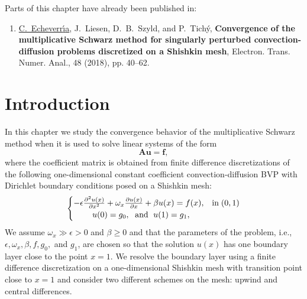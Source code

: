 Parts of this chapter have already been published in:
\vspace*{0.3cm}
%
\begin{enumerate}
\item[\cite{EchLieSzyTic18}] \underline{C.~Echeverr{\'\i}a}, J.~Liesen, D.~B.~Szyld, and P.~Tich{\'y}, \textbf{Convergence of the multiplicative Schwarz method for singularly perturbed convection-diffusion problems discretized on a Shishkin mesh}, Electron. Trans. Numer. Anal., 48 (2018), pp. 40--62.
\end{enumerate}
%
\vspace*{0.25cm}
%
\section{Introduction}
\label{1D:intro}

In this chapter we study the convergence behavior of the multiplicative
Schwarz method when it is used to solve linear systems of the form
%
\begin{equation}\label{eq:1D:linsys}
\mathbf{A}\mathbf{u}=\mathbf{f},
\end{equation}
%
where the coefficient matrix is obtained from finite difference discretizations
of the following one-dimensional constant coefficient convection-diffusion BVP
with Dirichlet boundary conditions posed on a Shishkin mesh:
\begin{equation}\label{eq:1D:bvp}
\begin{cases}
-\epsilon\frac{\partial^2 u(x)}{\partial x^2}+\omega_x \frac{\partial u(x)}{\partial x} + \beta u(x)=f(x), & \text{in}\; (0,1)\\
\hspace{0.8cm} u(0)=g_0,\;\text{ and }\;u(1)=g_1, &
\end{cases}
\end{equation}
%
We assume $\omega_x\gg \epsilon >0$ and $\beta\geq 0$ and that the parameters
of the problem, i.e., $\epsilon,\omega_x,\beta,f,g_0,$ and $g_1$, are chosen
so that the solution $u(x)$ has one boundary layer close to the point $x=1$.
We resolve the boundary layer using a finite difference discretization on a
one-dimensional Shishkin mesh with transition point close to $x=1$ and
consider two different schemes on the mesh: upwind and central differences.

